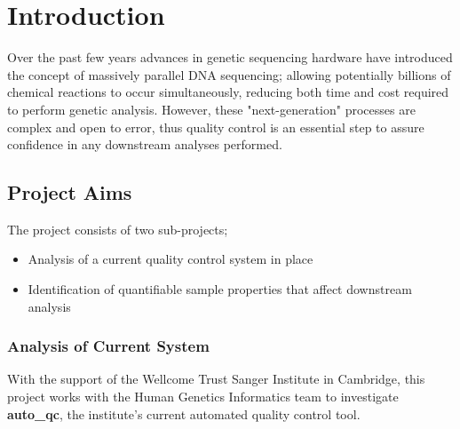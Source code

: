 \chapter{Introduction}
\ifpdf
    \graphicspath{{Chapter1/Figs/Raster/}{Chapter1/Figs/PDF/}{Chapter1/Figs/}}
\else
    \graphicspath{{Chapter1/Figs/Vector/}{Chapter1/Figs/}}
\fi


Over the past few years advances in genetic sequencing hardware have introduced
the concept of massively parallel DNA sequencing; allowing potentially billions
of chemical reactions to occur simultaneously, reducing both time and cost
required to perform genetic analysis\citep{HMG}. However, these
"next-generation" processes are complex and open to error\citep{Illumina}, thus
quality control is an essential step to assure confidence in any downstream
analyses performed.

\section{Project Aims}

The project consists of two sub-projects;

\begin{itemize}
    \item Analysis of a current quality control system in place
    \item Identification of quantifiable sample properties that affect downstream analysis
\end{itemize}


\subsection{Analysis of Current System}
With the support of the Wellcome Trust Sanger Institute in Cambridge, this
project works with the Human Genetics Informatics team to investigate
\textbf{auto\_qc}, the institute's current automated quality control tool.

